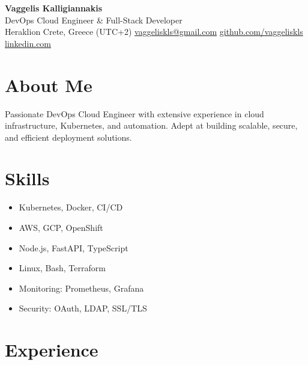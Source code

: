 \documentclass[a4paper,10pt]{article}
\begin{document}
\pagestyle{empty}

\begin{center}
    {\huge \textbf{Vaggelis Kalligiannakis} } \\
    \vspace{3pt}
    {\large DevOps Cloud Engineer \& Full-Stack Developer} \\
    \vspace{15pt}
     Heraklion Crete, Greece (UTC+2) \quad
     \href{mailto:vaggeliskls@gmail.com}{vaggeliskls@gmail.com} \quad
     \href{https://github.com/vaggeliskls}{github.com/vaggeliskls} \quad
     \href{https://www.linkedin.com/in/vaggelis-kls-5817bb47/}{linkedin.com}
\end{center}

\vspace{2pt}

\section*{ About Me}
Passionate DevOps Cloud Engineer with extensive experience in cloud infrastructure, Kubernetes, and automation. Adept at building scalable, secure, and efficient deployment solutions.

\vspace{2pt}

\section*{ Skills}
\begin{itemize}[left=0pt, label=]
    \item Kubernetes, Docker, CI/CD
    \item AWS, GCP, OpenShift
    \item Node.js, FastAPI, TypeScript
    \item Linux, Bash, Terraform
    \item Monitoring: Prometheus, Grafana
    \item Security: OAuth, LDAP, SSL/TLS
\end{itemize}

\vspace{2pt}

\section*{ Experience}
\end{document}

